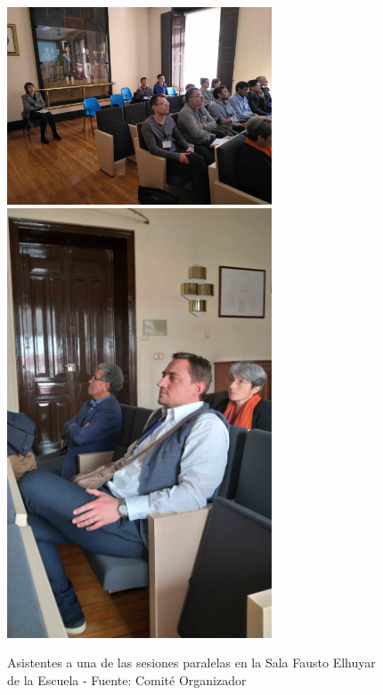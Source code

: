 \documentclass[twoside]{article}
\begin{document}
\begin{center}
\begin{figure}
	\centering
		\includegraphics[width=0.7\textwidth]{Fausto}
		\includegraphics[width=0.7\textwidth]{Puppo-Dumbser-Toro}
	\label{fig:FaustoElh}
	\caption{Asistentes a una de las sesiones paralelas en la Sala Fausto Elhuyar de la Escuela  - Fuente: Comité Organizador}
\end{figure}
\end{center}
%
%
\end{document}
